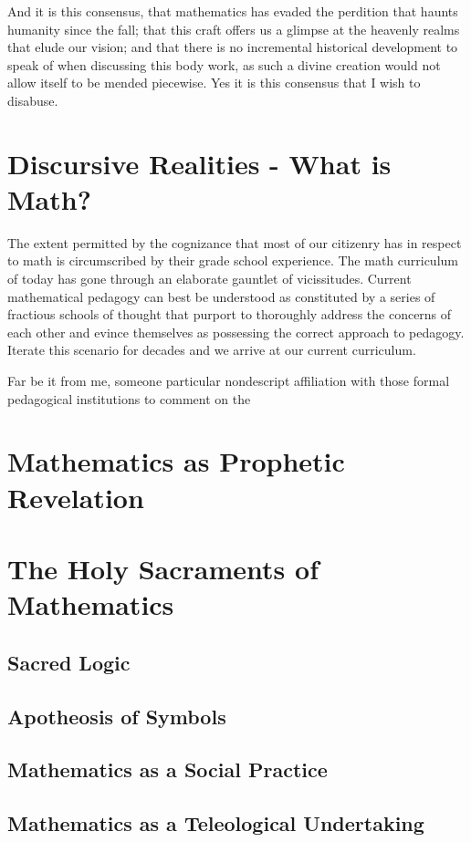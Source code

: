 \documentclass{article}
\begin{document}
	And it is this consensus, that mathematics has evaded the perdition that haunts humanity since the fall; that this craft offers us a glimpse at the heavenly realms that elude our vision; and that there is no incremental historical development to speak of when discussing this body work, as such a divine creation would not allow itself to be mended piecewise. Yes it is this consensus that I wish to disabuse.
	
	\section{Discursive Realities - What is Math?}
	The extent permitted by the cognizance that most of our citizenry has in respect to math is circumscribed by their grade school experience. The math curriculum of today has gone through an elaborate gauntlet of vicissitudes. Current mathematical pedagogy can best be understood as constituted by a series of fractious schools of thought that purport to thoroughly address the concerns of each other and evince themselves as possessing the correct approach to pedagogy. Iterate this scenario for decades and we arrive at our current curriculum.
	
	Far be it from me, someone particular nondescript affiliation with those formal pedagogical institutions to comment on the 
	
	\section{Mathematics as Prophetic Revelation}
	
	\section{The Holy Sacraments of Mathematics}
	\subsection{Sacred Logic}
	\subsection{Apotheosis of Symbols}
	\subsection{Mathematics as a Social Practice}
	\subsection{Mathematics as a Teleological Undertaking}
\end{document}
